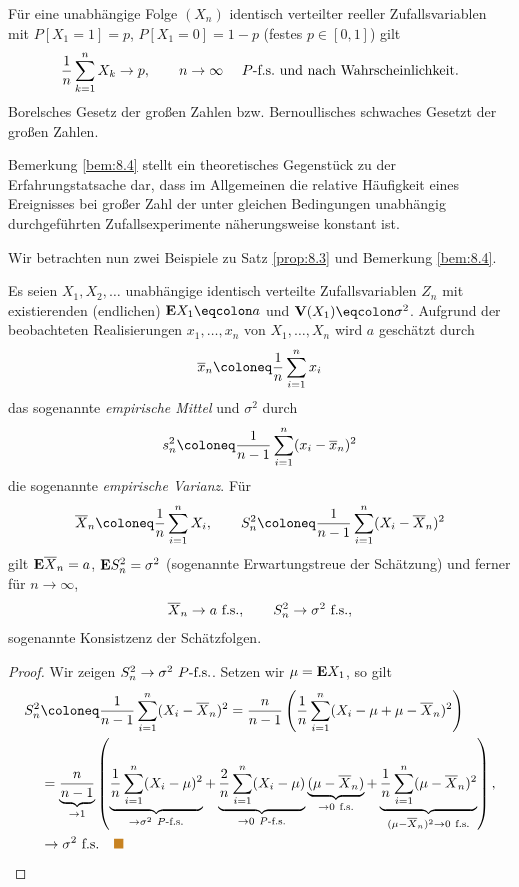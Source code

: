 \begin{bem}
\label{bem:8.4}
Für eine unabhängige Folge $(X_n)$ identisch verteilter reeller
Zufallsvariablen mit $P[X_1=1]=p$, $P[X_1=0]=1-p$ (festes $p\in[0,1]$) gilt
\begin{align*}
\frac{1}{n}\sum\limits_{k=1}^n X_k \to p,\qquad n\to\infty \quad \ P\text{-f.s.} \text{ und
nach Wahrscheinlichkeit}.
\end{align*}
Borelsches Gesetz der großen Zahlen bzw. Bernoullisches schwaches Gesetzt der
großen Zahlen.\maphere
\end{bem}

Bemerkung \ref{bem:8.4} stellt ein theoretisches Gegenstück zu der
Erfahrungstatsache dar, dass im Allgemeinen die relative Häufigkeit eines
Ereignisses bei großer Zahl der unter gleichen Bedingungen unabhängig 
durchgeführten Zufallsexperimente näherungsweise konstant ist.

Wir betrachten nun zwei Beispiele zu Satz \ref{prop:8.3} und Bemerkung
\ref{bem:8.4}.
\begin{bsp}
Es seien $X_1,X_2,\ldots$ unabhängige identisch verteilte Zufallsvariablen
$Z_n$ mit existierenden (endlichen) $\E X_1\defr a$ und $\V(X_1) \defr
\sigma^2$. Aufgrund der beobachteten Realisierungen $x_1,\ldots,x_n$ von $X_1,\ldots,X_n$
wird $a$ geschätzt durch
\begin{align*}
\overline{x}_n \defl \frac{1}{n}\sum\limits_{i=1}^n x_i
\end{align*}
das sogenannte \emph{empirische Mittel} und $\sigma^2$ durch
\begin{align*}
s_n^2 \defl \frac{1}{n-1}\sum\limits_{i=1}^n (x_i-\overline{x}_n)^2
\end{align*}
die sogenannte \emph{empirische Varianz}.
Für
\begin{align*}
\overline{X}_n \defl
\frac{1}{n}\sum\limits_{i=1}^n X_i,\qquad S_n^2 \defl \frac{1}{n-1}
\sum\limits_{i=1}^n (X_i-\overline{X}_n)^2
\end{align*}
gilt $\textbf{E}\overline{X}_n=a$, $\textbf{E} S_n^2 = \sigma^2$ (sogenannte Erwartungstreue der
Schätzung) und ferner für $n\to \infty$,
\begin{align*}
\overline{X}_n\to a\ \text{f.s.},\qquad S_n^2\to \sigma^2 \ \text{f.s.},
\end{align*}
sogenannte Konsistzenz der Schätzfolgen.\bsphere
\begin{proof}
Wir zeigen $S_n^2\to \sigma^2\ P\text{-f.s.}$. Setzen wir $\mu=\textbf{E} X_1$, so gilt
\begin{align*}
S_n^2 &\defl \frac{1}{n-1}\sum\limits_{i=1}^n (X_i-\overline{X}_n)^2
=
\frac{n}{n-1}\left(\frac{1}{n}\sum\limits_{i=1}^n
(X_i-\mu+\mu-\overline{X}_n)^2\right)\\
&=
\underbrace{\frac{n}{n-1}}_{\to
1}\left(\underbrace{\frac{1}{n}\sum\limits_{i=1}^n (X_i-\mu)^2}_{\to
\sigma^2\Pfs} + \underbrace{\frac{2}{n}\sum\limits_{i=1}^n (X_i-\mu)}_{\to 0
\Pfs}\underbrace{(\mu-\overline{X}_n)}_{\to 0\fs} +
\underbrace{\frac{1}{n}\sum\limits_{i=1}^n
(\mu-\overline{X}_n)^2}_{(\mu-\overline{X}_n)^2\to 0\fs} \right),\\
&\to \sigma^2\fs\bsphere
\end{align*}
\end{proof}
\end{bsp}

